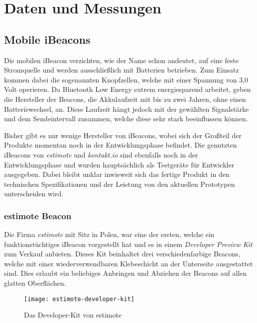 \chapter{Daten und Messungen}
\label{chap:dataandmeasure}

\section{Mobile iBeacons}
\label{sec:dataandmeasurement:mobilebeacon}
Die mobilen iBeacon verzichten, wie der Name schon andeutet, auf eine feste Stromquelle und werden ausschließlich mit Batterien betrieben.
Zum Einsatz kommen dabei die sogenannten Knopfzellen, welche mit einer Spannung von 3,0 Volt operieren.
Da Bluetooth Low Energy extrem energiesparend arbeitet, geben die Hersteller der Beacons, die Akkulaufzeit mit bis zu zwei Jahren, ohne einen Batteriewechsel, an. Diese Laufzeit hängt jedoch mit der gewählten Signalstärke und dem Sendeintervall zusammen, welche diese sehr stark beeinflussen können.

Bisher gibt es nur wenige Hersteller von iBeacons, wobei sich der Großteil der Produkte momentan noch in der Entwicklungsphase befindet. Die genutzten iBeacons von \emph{estimote} und \emph{kontakt.io} sind ebenfalls noch in der Entwicklungsphase und wurden hauptsächlich als Testgeräte für Entwickler ausgegeben. Dabei bleibt unklar inwieweit sich das fertige Produkt in den technischen Spezifikationen und der Leistung von den aktuellen Prototypen unterscheiden wird.

\subsection{estimote Beacon}
\label{sec:dataandmeasurement:mobilebeacon:estimote}
Die Firma \emph{estimote} \cite{estimote} mit Sitz in Polen, war eine der ersten, welche ein funktionstüchtiges iBeacon vorgestellt hat und es in einem \emph{Developer Preview Kit} zum Verkauf anbieten.
Dieses Kit beinhaltet drei verschiedenfarbige Beacons, welche mit einer wiederverwendbaren Klebeschicht an der Unterseite ausgestattet sind. Dies erlaubt ein beliebiges Anbringen und Abziehen der Beacons auf allen glatten Oberflächen.
\begin{figure}[htb!]
		\centering
	\texttt{[image: estimote-developer-kit]}
	\caption{Das Developer-Kit von estimote}
	\label{estimote-developer-kit}
\end{figure}

